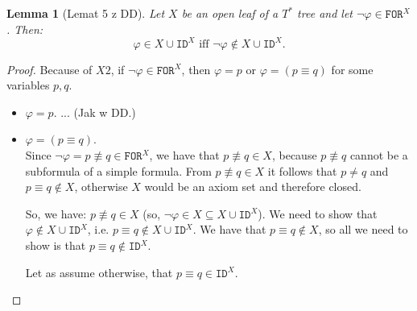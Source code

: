 \documentclass{article}
\newtheorem{lemma}[theorem]{Lemma}
\theoremstyle{definition}
\newcommand*{\Ts}{T^*}
\newcommand*{\id}{\equiv}
\newcommand*{\FOR}{\texttt{FOR}}
\newcommand*{\FORx}{\texttt{FOR}^X}
\newcommand*{\IDx}{\texttt{ID}^X}
\begin{document}
\begin{lemma}[Lemat 5 z DD]
    Let $X$ be an open leaf of a $\Ts$ tree and let $\lnot \varphi \in \FOR^X$. Then:
    $$
        \varphi \in X \cup \IDx \text{ iff } \lnot \varphi \not \in X \cup \IDx.
    $$
\end{lemma}
\begin{proof}
    Because of $X2$, if $\lnot \varphi \in \FORx$, then $\varphi = p$ or $\varphi = (p \id q)$ for some variables $p, q$.

    \begin{itemize}
        \item [1°] $\varphi = p$. ... (Jak w DD.)
        \item [2°] $\varphi = (p \id q)$. \\
              Since $\lnot \varphi = p \not \id q \in \FORx$, we have that $p \not \id q \in X$, because $p \not \id q$ cannot be a subformula of a simple formula. From $p \not \id q \in X$ it follows that $p \not = q$ and $p \id q \not \in X$, otherwise $X$ would be an axiom set and therefore closed.

              So, we have: $p \not \id q \in X$ (so, $\lnot \varphi \in X \subseteq X \cup \IDx$). We need to show that $\varphi \not \in X \cup \IDx$, i.e. $p \id q \not \in X \cup \IDx$. We have that $p \id q \not \in X$, so all we need to show is that $p \id q \not \in \IDx$.

              Let as assume otherwise, that $p \id q \in \IDx$.


\end{itemize}
\end{proof}
\end{document}
